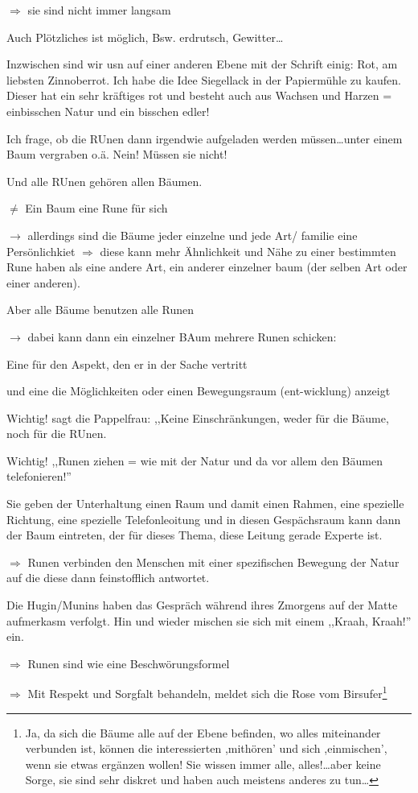\documentclass[11pt,titlepage,a5paper]{book}
\begin{document}
$\Rightarrow$ sie sind nicht immer langsam

Auch Plötzliches ist möglich, Bsw. erdrutsch, Gewitter\dots

Inzwischen sind wir usn auf einer anderen Ebene mit der Schrift einig: Rot, am liebsten Zinnoberrot. Ich habe die Idee Siegellack in der Papiermühle zu kaufen. Dieser hat ein sehr kräftiges rot und besteht auch aus Wachsen und Harzen = einbisschen Natur und ein bisschen edler!

Ich frage, ob die RUnen dann irgendwie aufgeladen werden müssen\dots unter einem Baum vergraben o.ä. Nein! Müssen sie nicht!

Und alle RUnen gehören allen Bäumen.

$\neq$ Ein Baum eine Rune für sich

$\rightarrow$ allerdings sind die Bäume jeder einzelne und jede Art/ familie eine Persönlichkiet $\Rightarrow$ diese kann mehr Ähnlichkeit und Nähe zu einer bestimmten Rune haben als eine andere Art, ein anderer einzelner baum (der selben Art oder einer anderen).

Aber alle Bäume benutzen alle Runen

$\rightarrow$ dabei kann dann ein einzelner BAum mehrere Runen schicken:

Eine für den Aspekt, den er in der Sache vertritt

und eine die Möglichkeiten oder einen Bewegungsraum (ent-wicklung) anzeigt

Wichtig! sagt die Pappelfrau: ,,Keine Einschränkungen, weder für die Bäume, noch für die RUnen.

Wichtig! ,,Runen ziehen = wie mit der Natur und da vor allem den Bäumen telefonieren!''

Sie geben der Unterhaltung einen Raum und damit einen Rahmen, eine spezielle Richtung, eine spezielle Telefonleoitung und in diesen Gespächsraum kann dann der Baum eintreten, der für dieses Thema, diese Leitung gerade Experte ist.

$\Rightarrow$ Runen verbinden den Menschen mit einer spezifischen Bewegung der Natur auf die diese dann feinstofflich antwortet.

Die Hugin/Munins haben das Gespräch während ihres Zmorgens auf der Matte aufmerkasm verfolgt. Hin und wieder mischen sie sich mit einem ,,Kraah, Kraah!'' ein. 

$\Rightarrow$ Runen sind wie eine Beschwörungsformel

$\Rightarrow$ Mit Respekt und Sorgfalt behandeln, meldet sich die Rose vom Birsufer\footnote{Ja, da sich die Bäume alle auf der Ebene befinden, wo alles miteinander verbunden ist, können die interessierten ,mithören' und sich ,einmischen', wenn sie etwas ergänzen wollen! Sie wissen immer alle, alles!\dots aber keine Sorge, sie sind sehr diskret und haben auch meistens anderes zu tun\dots}
\end{document}
